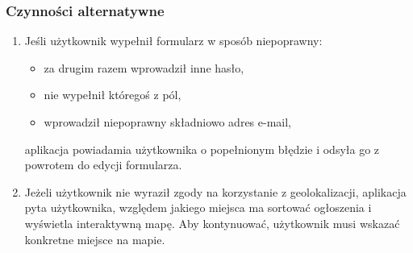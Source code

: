 \documentclass[licencjacka]{pracamgr}
\begin{document}
    \subsubsection{Czynności alternatywne}
    \begin{enumerate}
        \item Jeśli użytkownik wypełnił formularz w sposób niepoprawny:
        \begin{itemize}
            \item za drugim razem wprowadził inne hasło,
            \item nie wypełnił któregoś z pól,
            \item wprowadził niepoprawny składniowo adres e-mail,
        \end{itemize}
        aplikacja powiadamia użytkownika o popełnionym błędzie i odsyła go z powrotem do edycji formularza.
        \item Jeżeli użytkownik nie wyraził zgody na korzystanie z geolokalizacji, aplikacja pyta użytkownika, względem jakiego miejsca ma sortować ogłoszenia i wyświetla interaktywną mapę. Aby kontynuować, użytkownik musi wskazać konkretne miejsce na mapie.
    \end{enumerate}
\end{document}
